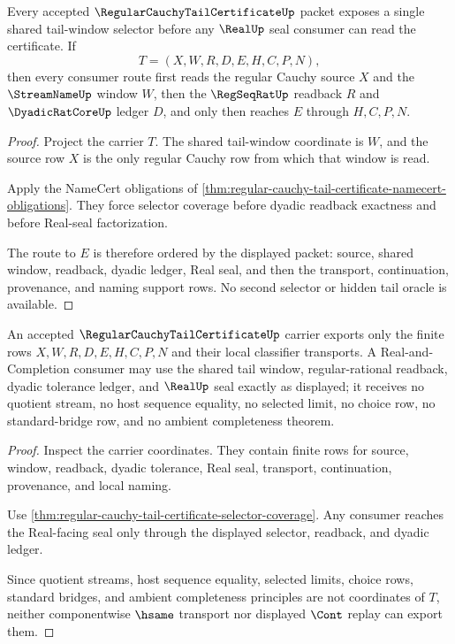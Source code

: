 \begin{theorem}
\label{thm:regular-cauchy-tail-certificate-selector-coverage}
Every accepted $\RegularCauchyTailCertificateUp$ packet exposes a single shared tail-window selector before any $\RealUp$ seal consumer can read the certificate. If
$$
T=(X,W,R,D,E,H,C,P,N),
$$
then every consumer route first reads the regular Cauchy source $X$ and the $\StreamNameUp$ window $W$, then the $\RegSeqRatUp$ readback $R$ and $\DyadicRatCoreUp$ ledger $D$, and only then reaches $E$ through $H,C,P,N$.
\end{theorem}
\begin{proof}
Project the carrier $T$. The shared tail-window coordinate is $W$, and the source row $X$ is the only regular Cauchy row from which that window is read.

Apply the NameCert obligations of \autoref{thm:regular-cauchy-tail-certificate-namecert-obligations}. They force selector coverage before dyadic readback exactness and before Real-seal factorization.

The route to $E$ is therefore ordered by the displayed packet: source, shared window, readback, dyadic ledger, Real seal, and then the transport, continuation, provenance, and naming support rows. No second selector or hidden tail oracle is available.
\end{proof}

\begin{theorem}
\label{thm:regular-cauchy-tail-certificate-nonescape}
An accepted $\RegularCauchyTailCertificateUp$ carrier exports only the finite rows $X,W,R,D,E,H,C,P,N$ and their local classifier transports. A Real-and-Completion consumer may use the shared tail window, regular-rational readback, dyadic tolerance ledger, and $\RealUp$ seal exactly as displayed; it receives no quotient stream, no host sequence equality, no selected limit, no choice row, no standard-bridge row, and no ambient completeness theorem.
\end{theorem}
\begin{proof}
Inspect the carrier coordinates. They contain finite rows for source, window, readback, dyadic tolerance, Real seal, transport, continuation, provenance, and local naming.

Use \autoref{thm:regular-cauchy-tail-certificate-selector-coverage}. Any consumer reaches the Real-facing seal only through the displayed selector, readback, and dyadic ledger.

Since quotient streams, host sequence equality, selected limits, choice rows, standard bridges, and ambient completeness principles are not coordinates of $T$, neither componentwise $\hsame$ transport nor displayed $\Cont$ replay can export them.
\end{proof}

